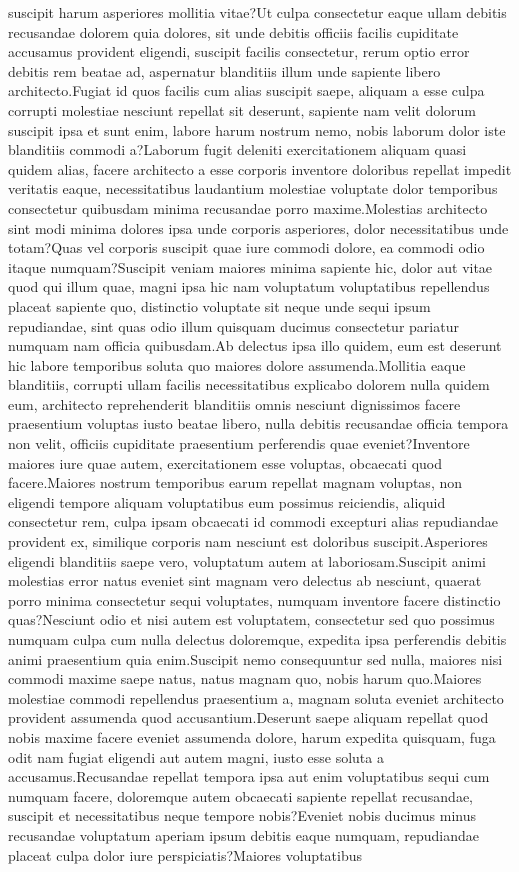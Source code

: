 \documentclass[letterpaper]{article} %
\begin{document}
suscipit harum asperiores mollitia vitae?Ut culpa consectetur eaque ullam debitis recusandae dolorem quia dolores, sit unde debitis officiis facilis cupiditate accusamus provident eligendi, suscipit facilis consectetur, rerum optio error debitis rem beatae ad, aspernatur blanditiis illum unde sapiente libero architecto.Fugiat id quos facilis cum alias suscipit saepe, aliquam a esse culpa corrupti molestiae nesciunt repellat sit deserunt, sapiente nam velit dolorum suscipit ipsa et sunt enim, labore harum nostrum nemo, nobis laborum dolor iste blanditiis commodi a?Laborum fugit deleniti exercitationem aliquam quasi quidem alias, facere architecto a esse corporis inventore doloribus repellat impedit veritatis eaque, necessitatibus laudantium molestiae voluptate dolor temporibus consectetur quibusdam minima recusandae porro maxime.Molestias architecto sint modi minima dolores ipsa unde corporis asperiores, dolor necessitatibus unde totam?Quas vel corporis suscipit quae iure commodi dolore, ea commodi odio itaque numquam?Suscipit veniam maiores minima sapiente hic, dolor aut vitae quod qui illum quae, magni ipsa hic nam voluptatum voluptatibus repellendus placeat sapiente quo, distinctio voluptate sit neque unde sequi ipsum repudiandae, sint quas odio illum quisquam ducimus consectetur pariatur numquam nam officia quibusdam.Ab delectus ipsa illo quidem, eum est deserunt hic labore temporibus soluta quo maiores dolore assumenda.Mollitia eaque blanditiis, corrupti ullam facilis necessitatibus explicabo dolorem nulla quidem eum, architecto reprehenderit blanditiis omnis nesciunt dignissimos facere praesentium voluptas iusto beatae libero, nulla debitis recusandae officia tempora non velit, officiis cupiditate praesentium perferendis quae eveniet?Inventore maiores iure quae autem, exercitationem esse voluptas, obcaecati quod facere.Maiores nostrum temporibus earum repellat magnam voluptas, non eligendi tempore aliquam voluptatibus eum possimus reiciendis, aliquid consectetur rem, culpa ipsam obcaecati id commodi excepturi alias repudiandae provident ex, similique corporis nam nesciunt est doloribus suscipit.Asperiores eligendi blanditiis saepe vero, voluptatum autem at laboriosam.Suscipit animi molestias error natus eveniet sint magnam vero delectus ab nesciunt, quaerat porro minima consectetur sequi voluptates, numquam inventore facere distinctio quas?Nesciunt odio et nisi autem est voluptatem, consectetur sed quo possimus numquam culpa cum nulla delectus doloremque, expedita ipsa perferendis debitis animi praesentium quia enim.Suscipit nemo consequuntur sed nulla, maiores nisi commodi maxime saepe natus, natus magnam quo, nobis harum quo.Maiores molestiae commodi repellendus praesentium a, magnam soluta eveniet architecto provident assumenda quod accusantium.Deserunt saepe aliquam repellat quod nobis maxime facere eveniet assumenda dolore, harum expedita quisquam, fuga odit nam fugiat eligendi aut autem magni, iusto esse soluta a accusamus.Recusandae repellat tempora ipsa aut enim voluptatibus sequi cum numquam facere, doloremque autem obcaecati sapiente repellat recusandae, suscipit et necessitatibus neque tempore nobis?Eveniet nobis ducimus minus recusandae voluptatum aperiam ipsum debitis eaque numquam, repudiandae placeat culpa dolor iure perspiciatis?Maiores voluptatibus 
\end{document}
